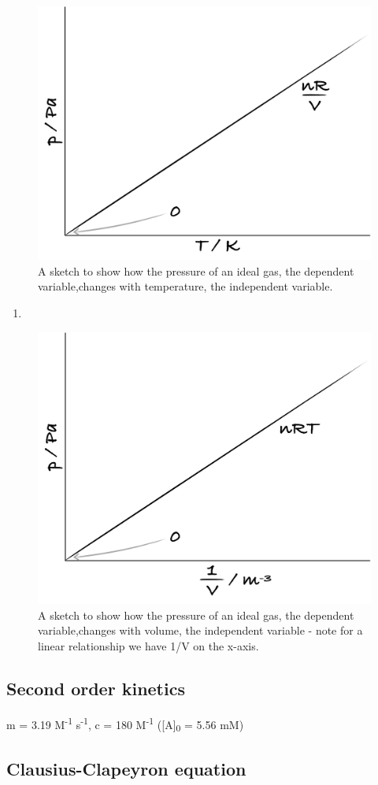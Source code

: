 \documentclass[
]{book}
\providecommand{\tightlist}{%
  \setlength{\itemsep}{0pt}\setlength{\parskip}{0pt}}
\begin{document}
\begin{figure}

{\centering \includegraphics[width=0.3\linewidth]{images/pTsketch} 

}

\caption{A sketch to show how the pressure of an ideal gas, the dependent variable,changes with temperature, the independent variable.}\label{fig:pT}
\end{figure}

\begin{enumerate}
\def\labelenumi{\arabic{enumi}.}
\setcounter{enumi}{2}
\tightlist
\item
\end{enumerate}

\begin{figure}

{\centering \includegraphics[width=0.3\linewidth]{images/pVsketch} 

}

\caption{A sketch to show how the pressure of an ideal gas, the dependent variable,changes with volume, the independent variable - note for a linear relationship we have 1/V on the x-axis.}\label{fig:pV}
\end{figure}

\hypertarget{subsec:2ndkinteticsans}{%
\subsection{Second order kinetics}\label{subsec:2ndkinteticsans}}

m = 3.19 M\textsuperscript{-1} s\textsuperscript{-1}, c = 180 M\textsuperscript{-1} ({[}A{]}\textsubscript{0} = 5.56 mM)

\hypertarget{subsec:clausiusans}{%
\subsection{Clausius-Clapeyron equation}\label{subsec:clausiusans}}
\end{document}
